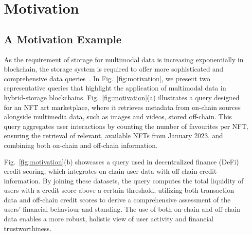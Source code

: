 \section{Motivation}


\subsection{A Motivation Example}


As the requirement of storage for multimodal data is increasing exponentially in blockchain, the storage system is required to offer more sophisticated and comprehensive data queries~\cite{V2FS2024}. In Fig.~\ref{fig:motivation}, we present two representative queries that highlight the application of multimodal data in hybrid-storage blockchains. Fig.~\ref{fig:motivation}(a) illustrates a query designed for an NFT art marketplace, where it retrieves metadata from on-chain sources alongside multimedia data, such as images and videos, stored off-chain. This query aggregates user interactions by counting the number of favourites per NFT, ensuring the retrieval of relevant, available NFTs from January 2023, and combining both on-chain and off-chain information.

Fig.~\ref{fig:motivation}(b) showcases a query used in decentralized finance (DeFi) credit scoring, which integrates on-chain user data with off-chain credit information. By joining these datasets, the query computes the total liquidity of users with a credit score above a certain threshold, utilizing both transaction data and off-chain credit scores to derive a comprehensive assessment of the users' financial behaviour and standing. The use of both on-chain and off-chain data enables a more robust, holistic view of user activity and financial trustworthiness.


